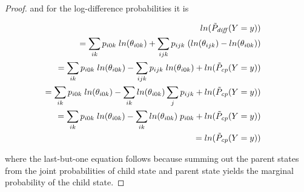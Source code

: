 \documentclass[twoside,leqno,twocolumn]{article}
\begin{document}
\begin{proof}
and for the log-difference probabilities it is 
%
\begin{small}
\begin{eqnarray*}
ln(\tilde{P}_{\it{diff}}(Y = y)) & & \\
= \sum_{ik} p_{i0k} \; ln(\theta_{i0k}) + \sum_{ijk} p_{ijk} \; (ln(\theta_{ijk}) - ln(\theta_{i0k})) && \\
=\sum_{ik} p_{i0k} \; ln(\theta_{i0k}) - \sum_{ijk} p_{ijk} \; ln(\theta_{i0k}) + ln(\tilde{P}_{\it{cp}}(Y = y)) && \\
=\sum_{ik} p_{i0k} \; ln(\theta_{i0k}) - \sum_{ik} ln(\theta_{i0k}) \sum_{j} p_{ijk} + ln(\tilde{P}_{\it{cp}}(Y = y)) && \\
=\sum_{ik} p_{i0k} \; ln(\theta_{i0k}) - \sum_{ik} ln(\theta_{i0k}) \; p_{i0k} + ln(\tilde{P}_{\it{cp}}(Y = y)) && \\
=ln(\tilde{P}_{\it{cp}}(Y = y))&&
\end{eqnarray*}
\end{small}
where the last-but-one equation follows 
%
%
%
because summing out the parent states from the joint probabilities of child state and parent state yields the marginal probability of the child state. \end{proof}
%






\end{document}
